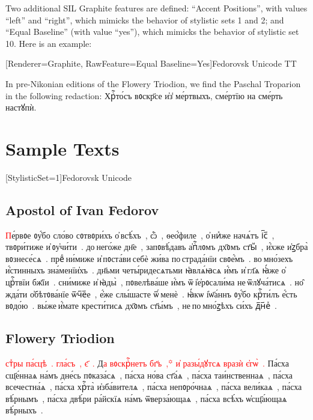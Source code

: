 Two additional SIL Graphite features are defined: ``Accent Positions'', with values ``left'' and ``right'', which mimicks the behavior of stylistic sets 1 and 2; 
and ``Equal Baseline'' (with value ``yes''), which mimicks the behavior of stylistic set 10. Here is an example:

\newfontfamily{\raised}[Renderer=Graphite, RawFeature={Equal Baseline=Yes}]{Fedorovsk Unicode TT}

{\Large \raised
In pre-Nikonian editions of the Flowery Triodion, we find the Paschal Troparion in the following redaction: Хрⷭ҇то́съ вᲂскр҃се и҆з̾ ме́ртвыхъ, сме́ртїю на сме́рть настꙋпѝ.
}

\section{Sample Texts}
\newfontfamily{\right}[StylisticSet=1]{Fedorovsk Unicode}

\subsection{Apostol of Ivan Fedorov}

{\Large \right
\textcolor{red}{П}е́рвᲂе ᲂу҆́бо︀ сло́во︀ сᲂтвᲂри́хъ о҆ всѣ́хъ , ѽ , ѳео҆́филе , о҆ ниⷯже начѧ́тъ і︮с︯ , твᲂри́тиже и҆ ᲂу҆чи́ти . д︀о︀ него́же дн҃е , запᲂвѣ́д︀авъ а҆пⷭ҇лᲂмъ дх҃ᲂмъ ст҃ыⷨ , и҆́хже и҆ꙁбра̀ вᲂзнесе́сѧ . преⷣ ни́миже и҆ пᲂста́ви себѐ жи́ва по страд︀а́нїи свᲂе҆́мъ . во︀ мно́зехъ и҆́стинныхъ зна́менїи҆хъ . дн҃ьми четы́ридесѧтьми ꙗ҆влѧ́ꙗсѧ и҆́мъ и҆ гл҃ѧ ꙗ҆́же о҆ црⷭ҇твїи бж҃їи . сни́миже и҆ ꙗ҆д︀ы̀ , пᲂвелѣва́ше и҆́мъ ѿ і҆е҆рᲂсали́ма не ѿлꙋча́тисѧ . но̑ жда́ти о҆бѣтᲂва́нїе ѿч︮е︯е , е҆́же слы́шасте ѿ́ менѐ . ꙗ҆́кѡ і҆ѡ҃а́ннъ ᲂу҆́бо︀ крⷭ҇ти́лъ е҆́сть вᲂдо́ю . вы́же и҆́мате крести́тисѧ дх҃ᲂмъ ст҃ы́мъ , не по мно́ꙁѣхъ си́хъ д︀︮н︯еⷯ .

}

\subsection{Flowery Triodion}

{\Large \glyphfont

\textcolor{red}{стⷯры па́сцѣ . гла́съ , є҃ .} Д\textcolor{red}{а вᲂскрⷭ҇нетъ бг҃ъ ,꙳ и҆ разы́дꙋтсѧ вразѝ є҆гѡ̀ .}
Па́сха сщ҃е́ннаѧ на́мъ дне́сь пᲂказа́сѧ , па́сха но́ва ст҃а́ѧ , па́сха таи́нственнаѧ , па́сха всечестна́ѧ , па́сха хрⷭ҇та̀ и҆зба́вителѧ , па́сха непᲂро́чнаѧ , па́сха вели́каѧ , па́сха вѣ́рнымъ , па́сха двѣ́ри ра́йскїѧ на́мъ ѿверза́ющаѧ , па́сха всѣ́хъ ѡ҆сщ҃а́ющаѧ вѣ́рныхъ .
}
